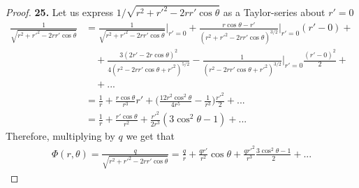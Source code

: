 \documentclass[11pt]{article}
\theoremstyle{definition}
\begin{document}
\cleardoublepage
\begin{proof}{\textbf{25.}}
Let us express $1/\sqrt{r^2 + r'^2 - 2rr'\cos\theta}$ as a Taylor-series about
$r'= 0$
\begin{align*}
    \frac{1}{\sqrt{r^2 + r'^2 - 2rr'\cos\theta}}
    &=  \frac{1}{\sqrt{r^2 + r'^2 - 2rr'\cos\theta}}\bigg|_{r'=0}
    + \frac{r\cos\theta - r'}{(r^2 + r'^2 - 2rr'\cos\theta)^{3/2}}\bigg|_{r'=0}(r' - 0) +\\
    &\quad+ \frac{3(2r' - 2r\cos\theta)^2}{4(r^2 - 2rr'\cos\theta + r'^2)^{5/2}}
    - \frac{1}{(r^2 - 2rr'\cos\theta + r'^2)^{3/2}}\bigg|_{r'=0}\frac{(r' - 0)^2}{2} +\\
    &\quad+ ...\\
    &=  \frac{1}{r} + \frac{r\cos\theta}{r^3}r'
    + \bigg(\frac{12r^2\cos^2\theta}{4r^5} - \frac{1}{r^3}\bigg)\frac{r'^2}{2} + ...\\
    &=  \frac{1}{r} + \frac{r'\cos\theta}{r^2}
    + \frac{r'^2}{2r^3}(3\cos^2\theta - 1) + ...
\end{align*}
Therefore, multiplying by $q$ we get that
\begin{align*}
    \Phi(r, \theta) = \frac{q}{\sqrt{r^2 + r'^2 - 2rr'\cos\theta}}
    = \frac{q}{r} + \frac{qr'}{r^2}\cos\theta
    + \frac{qr'^2}{r^3}\frac{3\cos^2\theta - 1}{2} + ...
\end{align*}
\end{proof}
\end{document}

